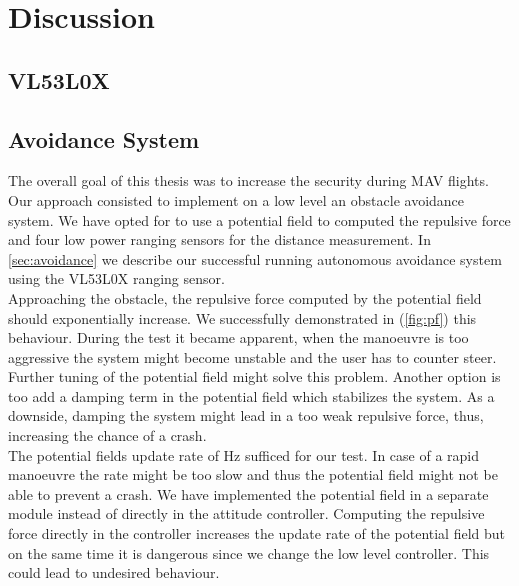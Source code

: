 \chapter{Discussion}

\section{VL53L0X}

\section{Avoidance System}

The overall goal of this thesis was to increase the security during MAV flights. Our approach consisted to implement on a low level an obstacle avoidance system. We have opted for to use a potential field to computed the repulsive force and four low power ranging sensors for the distance measurement. In \cref{sec:avoidance} we describe our successful running autonomous avoidance system using the VL53L0X ranging sensor. \\
Approaching the obstacle, the repulsive force computed by the potential field should exponentially increase. We successfully demonstrated in (\cref{fig:pf}) this behaviour. During the test it became apparent, when the manoeuvre is too aggressive the system might become unstable and the user has to counter steer. Further tuning of the potential field might solve this problem. Another option is too add a damping term in the potential field which stabilizes the system. As a downside, damping the system might lead in a too weak repulsive force, thus, increasing the chance of a crash.\\
The potential fields update rate of \unit[5]{Hz} sufficed for our test. In case of a rapid manoeuvre the rate might be too slow and thus the potential field might not be able to prevent a crash. We have implemented the potential field in a separate module instead of directly in the attitude controller. Computing the repulsive force directly in the controller increases the update rate of the potential field but on the same time it is dangerous since we change the low level controller. This could lead to undesired behaviour. \\

